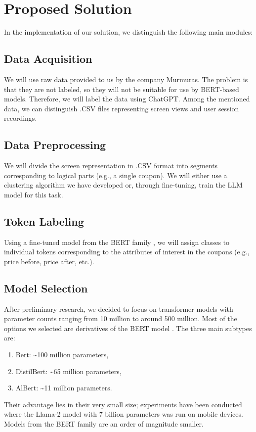\documentclass[12pt]{article}
\begin{document}
\section*{Proposed Solution}
In the implementation of our solution, we distinguish the following main modules:

\subsection*{Data Acquisition}
We will use raw data provided to us by the company Murmuras. The problem is that they are not labeled, so they will not be suitable for use by BERT-based models. Therefore, we will label the data using ChatGPT. Among the mentioned data, we can distinguish .CSV files representing screen views and user session recordings.

\subsection*{Data Preprocessing}
We will divide the screen representation in .CSV format into segments corresponding to logical parts (e.g., a single coupon). We will either use a clustering algorithm we have developed or, through fine-tuning, train the LLM model for this task.

\subsection*{Token Labeling}
Using a fine-tuned model from the BERT family \cite{devlin2019bertpretrainingdeepbidirectional}, we will assign classes to individual tokens corresponding to the attributes of interest in the coupons (e.g., price before, price after, etc.).
    
\subsection*{Model Selection}
After preliminary research, we decided to focus on transformer models with parameter counts ranging from 10 million to around 500 million. Most of the options we selected are derivatives of the BERT model \cite{devlin2019bertpretrainingdeepbidirectional}. The three main subtypes are:
\begin{enumerate}
    \item Bert: \textasciitilde100 million parameters,
    \item DistilBert: \textasciitilde65 million parameters,
    \item AlBert: \textasciitilde11 million parameters.
\end{enumerate}
Their advantage lies in their very small size; experiments \cite{LLMmobile2024} have been conducted where the Llama-2 model with 7 billion parameters was run on mobile devices. Models from the BERT family are an order of magnitude smaller.
\end{document}
